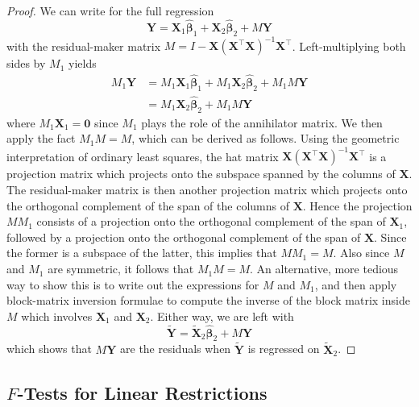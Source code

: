 \documentclass[11pt]{report} %
\begin{document}
\begin{proof}
We can write for the full regression
\begin{equation}
\mathbf{Y} = \mathbf{X}_{1}\widehat{\boldsymbol{\beta}}_{1} + \mathbf{X}_{2}\widehat{\boldsymbol{\beta}}_{2} + M\mathbf{Y}
\end{equation}
with the residual-maker matrix $M = I - \mathbf{X}\left(\mathbf{X}^{\top}\mathbf{X}\right)^{-1}\mathbf{X}^{\top}$. Left-multiplying both sides by $M_{1}$ yields
\begin{align}
M_{1}\mathbf{Y} &= M_{1}\mathbf{X}_{1}\widehat{\boldsymbol{\beta}}_{1} + M_{1}\mathbf{X}_{2}\widehat{\boldsymbol{\beta}}_{2} + M_{1}M\mathbf{Y} \\
&= M_{1}\mathbf{X}_{2}\widehat{\boldsymbol{\beta}}_{2} + M_{1}M\mathbf{Y}
\end{align}
where $M_{1}\mathbf{X}_{1} = \mathbf{0}$ since $M_{1}$ plays the role of the annihilator matrix. We then apply the fact $M_{1}M = M$, which can be derived as follows. Using the geometric interpretation of ordinary least squares, the hat matrix $\mathbf{X}\left(\mathbf{X}^{\top}\mathbf{X}\right)^{-1}\mathbf{X}^{\top}$ is a projection matrix which projects onto the subspace spanned by the columns of $\mathbf{X}$. The residual-maker matrix is then another projection matrix which projects onto the orthogonal complement of the span of the columns of $\mathbf{X}$. Hence the projection $MM_{1}$ consists of a projection onto the orthogonal complement of the span of $\mathbf{X}_{1}$, followed by a projection onto the orthogonal complement of the span of $\mathbf{X}$. Since the former is a subspace of the latter, this implies that $MM_{1} = M$. Also since $M$ and $M_{1}$ are symmetric, it follows that $M_{1}M = M$. An alternative, more tedious way to show this is to write out the expressions for $M$ and $M_{1}$, and then apply block-matrix inversion formulae to compute the inverse of the block matrix inside $M$ which involves $\mathbf{X}_{1}$ and $\mathbf{X}_{2}$. Either way, we are left with
\begin{equation}
\widetilde{\mathbf{Y}} = \widetilde{\mathbf{X}}_{2}\widehat{\boldsymbol{\beta}}_{2} + M\mathbf{Y}
\end{equation}
which shows that $M\mathbf{Y}$ are the residuals when $\widetilde{\mathbf{Y}}$ is regressed on $\widetilde{\mathbf{X}}_{2}$.
\end{proof}

\subsection{$F$-Tests for Linear Restrictions}
\end{document}
